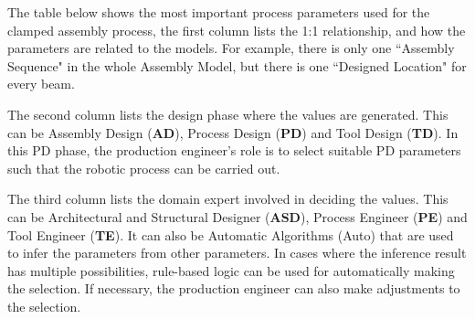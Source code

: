 \documentclass[11pt]{book}
\begin{document}
The table below shows the most important process parameters used for the clamped assembly process, the first column lists the 1:1 relationship, and how the parameters are related to the models. For example, there is only one ``Assembly Sequence" in the whole Assembly Model, but there is one ``Designed Location" for every beam.

The second column lists the design phase where the values are generated. This can be Assembly Design (\textbf{AD}), Process Design (\textbf{PD}) and Tool Design (\textbf{TD}). In this PD phase, the production engineer’s role is to select suitable PD parameters such that the robotic process can be carried out. 

The third column lists the domain expert involved in deciding the values. This can be Architectural and Structural Designer (\textbf{ASD}), Process Engineer (\textbf{PE}) and Tool Engineer (\textbf{TE}). It can also be Automatic Algorithms (Auto) that are used to infer the parameters from other parameters. In cases where the inference result has multiple possibilities, rule-based logic can be used for automatically making the selection. If necessary, the production engineer can also make adjustments to the selection.
\end{document}
